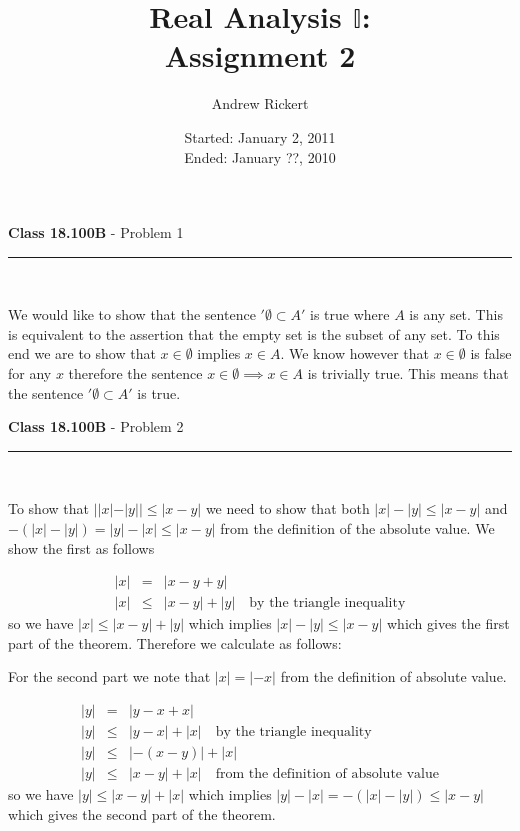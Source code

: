 \documentclass[11pt,reqno]{article}
\title{Real Analysis $\mathbb{I}$: \\ Assignment 2}
\author{Andrew Rickert}
\date{Started: January 2, 2011 \\ \hspace{1pt} Ended: January ??, 2010}                                           %
\begin{document}
\maketitle


\begin{flushleft} 
\textbf{Class 18.100B} - Problem 1\\
\rule{500pt}{1pt}\\
\end{flushleft} 

We would like to show that the sentence $'\emptyset \subset A'$ is true where $A$ is any set. This is equivalent to the assertion that the empty set is the subset of any set. To this end we are to show that $x \in \emptyset$ implies $x \in A$. We know however that $x \in \emptyset$ is false for any $x$ therefore the sentence  $x \in \emptyset \implies x \in A$ is trivially true. This means that the sentence  $'\emptyset \subset A'$ is true.


\vspace{15pt}
\begin{flushleft} 
\textbf{Class 18.100B} - Problem 2\\
\rule{500pt}{1pt}\\
\end{flushleft} 

To show that $||x| - |y|| \le |x - y|$ we need to show that both $|x| - |y| \le |x - y|$ and \\$-(|x| - |y|) = |y| - |x| \le |x - y|$ from the definition of the absolute value. We show the first as follows

\begin{eqnarray*}
|x| &=& |x - y + y| \\
|x| &\le& |x - y| + |y| \quad \text{by the triangle inequality}
\end{eqnarray*}
so we have $|x| \le |x - y| + |y|$ which implies $|x| -|y| \le |x - y| $ which gives the first part of the theorem. Therefore we calculate as follows:

For the second part we note that $|x| = |-x|$ from the definition of absolute value.

\begin{eqnarray*}
|y| &=& |y - x + x| \\
|y| &\le& |y - x| + |x| \quad \text{by the triangle inequality} \\
|y| &\le& |-(x - y)| + |x| \\
|y| &\le& |x - y| + |x| \quad \text{from the definition of absolute value}
\end{eqnarray*}
so we have $|y| \le |x - y| + |x|$ which implies $|y| -|x|  = -(|x|-|y|) \le |x - y| $ which gives the second part of the theorem. 
\end{document}
